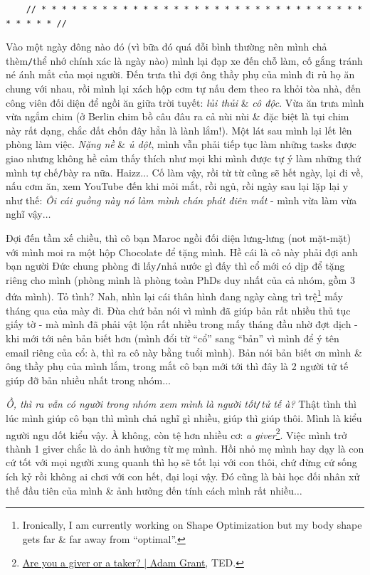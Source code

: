 \documentclass[12pt]{article}
\begin{document}
\begin{verbatim}
	// * * * * * * * * * * * * * * * * * * * * * * * * * * * * * * * * * * * * * //
\end{verbatim}

\noindent
{} Vào một ngày đông nào đó (vì bữa đó quá đỗi bình thường nên mình chả thèm{\tt/}thể nhớ chính xác là ngày nào) mình lại đạp xe đến chỗ làm, cố gắng tránh né ánh mắt của mọi người. Đến trưa thì đợi ông thầy phụ của mình đi rủ họ ăn chung với nhau, rồi mình lại xách hộp cơm tự nấu đem theo ra khỏi tòa nhà, đến công viên đối diện để ngồi ăn giữa trời tuyết: {\it lủi thủi} \& {\it cô độc}. Vừa ăn trưa mình vừa ngắm chim (ở Berlin chim bồ câu đâu ra cả nùi nùi \& đặc biệt là tụi chim này rất dạng, chắc đất chốn đây hẳn là lành lắm!). Một lát sau mình lại lết lên phòng làm việc. {\it Nặng nề} \& {\it ủ dột}, mình vẫn phải tiếp tục làm những tasks được giao nhưng không hề cảm thấy thích như mọi khi mình được tự ý làm những thứ mình tự chế{\tt/}bày ra nữa. Haizz$\ldots$ Cố làm vậy, rồi từ từ cũng sẽ hết ngày, lại đi về, nấu cơm ăn, xem YouTube đến khi mỏi mắt, rồi ngủ, rồi ngày sau lại lặp lại y như thế: {\it Ôi cái guồng này nó làm mình chán phát điên mất} - mình vừa làm vừa nghĩ vậy$\ldots$

Đợi đến tầm xế chiều, thì cô bạn Maroc ngồi đối diện lưng-lưng (not mặt-mặt) với mình moi ra một hộp Chocolate để tặng mình. Hề cái là cô này phải đợi anh bạn người Đức chung phòng đi lấy{\tt/}nhả nước gì đấy thì cổ mới có dịp để tặng riêng cho mình (phòng mình là phòng toàn PhDs duy nhất của cả nhóm, gồm 3 đứa mình). Tỏ tình? Nah, nhìn lại cái thân hình đang ngày càng trì trệ\footnote{Ironically, I am currently working on Shape Optimization but my body shape gets far \& far away from ``optimal''.} mấy tháng qua của mày đi. Đùa chứ bản nói vì mình đã giúp bản rất nhiều thủ tục giấy tờ - mà mình đã phải vật lộn rất nhiều trong mấy tháng đầu nhờ đợt dịch - khi mới tới nên bản biết hơn (mình đổi từ ``cổ'' sang ``bản'' vì mình để ý tên email riêng của cổ: à, thì ra cô này bằng tuổi mình). Bản nói bản biết ơn mình \& ông thầy phụ của mình lắm, trong mắt cô bạn mới tới thì đây là 2 người tử tế giúp đỡ bản nhiều nhất trong nhóm$\ldots$

{\it Ồ, thì ra vẫn có người trong nhóm xem mình là người tốt{\tt/}tử tế à?} Thật tình thì lúc mình giúp cô bạn thì mình chả nghĩ gì nhiều, giúp thì giúp thôi. Mình là kiểu người ngu dốt kiểu vậy. À không, còn tệ hơn nhiều cơ: {\it a giver}\footnote{\href{https://www.youtube.com/watch?v=YyXRYgjQXX0}{Are you a giver or a taker? | Adam Grant}, TED.}. Việc mình trở thành 1 giver chắc là do ảnh hưởng từ mẹ mình. Hồi nhỏ mẹ mình hay dạy là con cứ tốt với mọi người xung quanh thì họ sẽ tốt lại với con thôi, chứ đừng cứ sống ích kỷ rồi không ai chơi với con hết, đại loại vậy. Đó cũng là bài học đối nhân xử thế đầu tiên của mình \& ảnh hưởng đến tính cách mình rất nhiều$\ldots$
\end{document}

